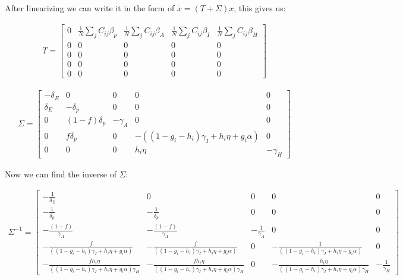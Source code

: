 \documentclass{article}
\begin{document}
\noindent
After linearizing we can write it in the form of $\dot{x} = (T + \Sigma) x$, this gives us:

\begin{gather}
 T =
  \begin{bmatrix}
   0 & \frac{1}{N} \sum_{j} C_{ij}\beta_p & 
   \frac{1}{N} \sum_{j} C_{ij}\beta_A &
   \frac{1}{N} \sum_{j} C_{ij}\beta_I &
   \frac{1}{N} \sum_{j} C_{ij}\beta_H \\
   0 & 0 & 0 & 0 & 0 \\
   0 & 0 & 0 & 0 & 0 \\
   0 & 0 & 0 & 0 & 0 \\
   0 & 0 & 0 & 0 & 0
   \end{bmatrix}
\end{gather}

\begin{gather}
 \Sigma =
  \begin{bmatrix}
   - \delta_E & 0 & 0 & 0 & 0 \\
   \delta_E & -\delta_p & 0 & 0 & 0 \\
   0 & (1-f) \delta_p & -\gamma_A & 0 & 0 \\
   0 & f \delta_p & 0 & - ((1-g_i-h_i) \gamma_{I} + h_i \eta + g_i \alpha) & 0 \\
   0 & 0 & 0 & h_i \eta & -\gamma_H
   \end{bmatrix}
\end{gather}

Now we can find the inverse of $\Sigma$: 

\begin{gather}
 \Sigma^{-1} =
  \begin{bmatrix}
   - \frac{1}{\delta_E} & 0 & 0 & 0 & 0 \\
   -\frac{1}{\delta_p} & -\frac{1}{\delta_p} & 0 & 0 & 0 \\
   -\frac{(1-f)}{\gamma_A} & -\frac{(1-f)}{\gamma_A} & -\frac{1}{\gamma_A} & 0 & 0 \\
   -\frac{f}{((1-g_i-h_i) \gamma_{I} + h_i \eta + g_i \alpha)} & -\frac{f}{((1-g_i-h_i) \gamma_{I} + h_i \eta + g_i \alpha)} & 0 & -\frac{1}{((1-g_i-h_i) \gamma_{I} + h_i \eta + g_i \alpha)} & 0 \\
   -\frac{fh_i \eta}{((1-g_i-h_i) \gamma_{I} + h_i \eta + g_i \alpha)\gamma_H} & -\frac{fh_i \eta}{((1-g_i-h_i) \gamma_{I} + h_i \eta + g_i \alpha)\gamma_H} & 0 & -\frac{h_i \eta}{((1-g_i-h_i) \gamma_{I} + h_i \eta + g_i \alpha)\gamma_H} & -\frac{1}{\gamma_H}
   \end{bmatrix}
\end{gather}
\end{document}

